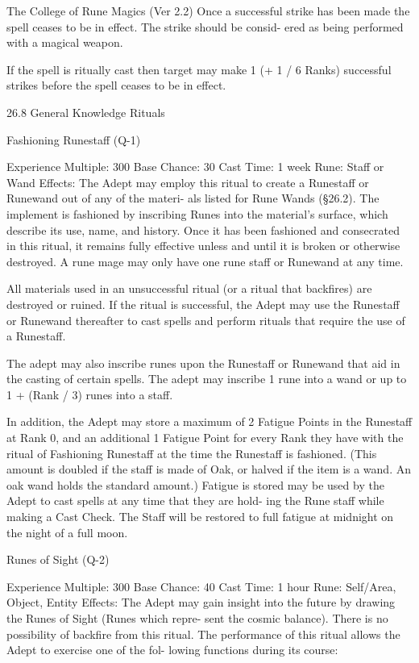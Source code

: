 \begin{Chapter}{The College of Rune Magics (Ver 2.2)}
Once  a  successful  strike  has  been  made  the  spell 
ceases to be in effect. The strike should be consid-
ered as being performed with a magical weapon. 

If  the  spell  is  ritually  cast  then target  may  make 1 
(+  1  /  6  Ranks)  successful  strikes  before  the  spell 
ceases to be in effect. 

26.8 General Knowledge Rituals 

Fashioning Runestaff (Q-1) 

Experience Multiple: 300 
Base Chance: 30%
Cast Time: 1 week 
Rune: Staff or Wand 
Effects: The Adept may employ this ritual to create 
a Runestaff or Runewand out of any of the materi-
als listed for Rune Wands  (§26.2). The implement 
is fashioned by inscribing Runes into the material’s 
surface, which describe its use, name, and history. 
Once it has been fashioned and consecrated in this 
ritual,  it  remains  fully  effective  unless  and  until  it 
is  broken  or  otherwise  destroyed.  A  rune  mage 
may only have one rune staff or Runewand at  any 
time. 

All  materials  used  in  an  unsuccessful  ritual  (or  a 
ritual that backfires) are destroyed or ruined. If the 
ritual  is  successful,  the  Adept  may  use  the 
Runestaff or Runewand thereafter to cast spells and 
perform rituals that require the use of a Runestaff. 

The  adept  may  also  inscribe  runes  upon  the 
Runestaff  or  Runewand  that  aid  in  the  casting  of 
certain spells. The adept may inscribe 1 rune into a 
wand or up to 1 + (Rank / 3) runes into a staff. 

In  addition,  the  Adept  may  store  a  maximum of  2 
Fatigue  Points  in  the  Runestaff  at  Rank  0,  and  an 
additional  1  Fatigue  Point  for  every  Rank  they 
have with the ritual of Fashioning Runestaff at the 
time  the  Runestaff  is  fashioned.  (This  amount  is 
doubled if the staff is made of Oak, or halved if the 
item  is  a  wand.  An  oak  wand  holds  the  standard 
amount.)  Fatigue  is  stored  may  be  used  by  the 
Adept to cast spells at any time that they are hold-
ing the Rune staff while making a Cast Check. The 
Staff will be restored to full fatigue at midnight on 
the night of a full moon. 

Runes of Sight (Q-2) 

Experience Multiple: 300 
Base Chance: 40%
Cast Time: 1 hour 
Rune: Self/Area, Object, Entity 
Effects: The Adept may gain insight into the future 
by drawing the Runes of Sight (Runes which repre-
sent the cosmic balance). There is no possibility of 
backfire  from  this  ritual.  The  performance  of  this 
ritual  allows  the  Adept  to  exercise  one  of  the  fol-
lowing functions during its course: 


\end{Chapter}
